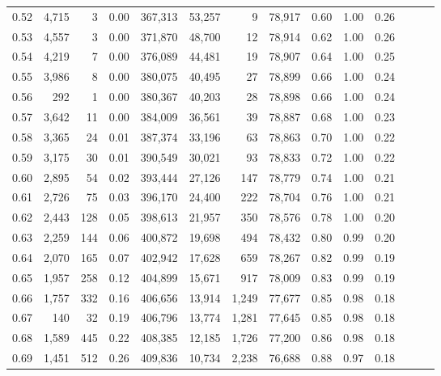 \begin{tabular}{rrrrrrrrrrrrrr}
0.52 &   4,715 &      3 &  0.00 &  367,313 &   53,257 &       9 &  78,917 &  0.60 &  1.00 &      0.26 \\
0.53 &   4,557 &      3 &  0.00 &  371,870 &   48,700 &      12 &  78,914 &  0.62 &  1.00 &      0.26 \\
0.54 &   4,219 &      7 &  0.00 &  376,089 &   44,481 &      19 &  78,907 &  0.64 &  1.00 &      0.25 \\
0.55 &   3,986 &      8 &  0.00 &  380,075 &   40,495 &      27 &  78,899 &  0.66 &  1.00 &      0.24 \\
0.56 &     292 &      1 &  0.00 &  380,367 &   40,203 &      28 &  78,898 &  0.66 &  1.00 &      0.24 \\
0.57 &   3,642 &     11 &  0.00 &  384,009 &   36,561 &      39 &  78,887 &  0.68 &  1.00 &      0.23 \\
0.58 &   3,365 &     24 &  0.01 &  387,374 &   33,196 &      63 &  78,863 &  0.70 &  1.00 &      0.22 \\
0.59 &   3,175 &     30 &  0.01 &  390,549 &   30,021 &      93 &  78,833 &  0.72 &  1.00 &      0.22 \\
0.60 &   2,895 &     54 &  0.02 &  393,444 &   27,126 &     147 &  78,779 &  0.74 &  1.00 &      0.21 \\
0.61 &   2,726 &     75 &  0.03 &  396,170 &   24,400 &     222 &  78,704 &  0.76 &  1.00 &      0.21 \\
0.62 &   2,443 &    128 &  0.05 &  398,613 &   21,957 &     350 &  78,576 &  0.78 &  1.00 &      0.20 \\
0.63 &   2,259 &    144 &  0.06 &  400,872 &   19,698 &     494 &  78,432 &  0.80 &  0.99 &      0.20 \\
0.64 &   2,070 &    165 &  0.07 &  402,942 &   17,628 &     659 &  78,267 &  0.82 &  0.99 &      0.19 \\
0.65 &   1,957 &    258 &  0.12 &  404,899 &   15,671 &     917 &  78,009 &  0.83 &  0.99 &      0.19 \\
0.66 &   1,757 &    332 &  0.16 &  406,656 &   13,914 &   1,249 &  77,677 &  0.85 &  0.98 &      0.18 \\
0.67 &     140 &     32 &  0.19 &  406,796 &   13,774 &   1,281 &  77,645 &  0.85 &  0.98 &      0.18 \\
0.68 &   1,589 &    445 &  0.22 &  408,385 &   12,185 &   1,726 &  77,200 &  0.86 &  0.98 &      0.18 \\
0.69 &   1,451 &    512 &  0.26 &  409,836 &   10,734 &   2,238 &  76,688 &  0.88 &  0.97 &      0.18 \\

\end{tabular}

